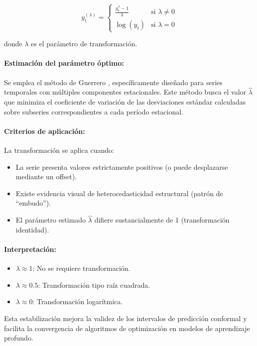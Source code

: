 \begin{equation}
y_t^{(\lambda)} = \begin{cases}
\frac{y_t^\lambda - 1}{\lambda} & \text{si } \lambda \neq 0 \\
\log(y_t) & \text{si } \lambda = 0
\end{cases}
\label{eq:boxcox}
\end{equation}

donde $\lambda$ es el parámetro de transformación.

\paragraph{Estimación del parámetro óptimo:} Se emplea el método de Guerrero \parencite{Guerrero1993}, específicamente diseñado para series temporales con múltiples componentes estacionales. Este método busca el valor $\hat{\lambda}$ que minimiza el coeficiente de variación de las desviaciones estándar calculadas sobre subseries correspondientes a cada período estacional.

\paragraph{Criterios de aplicación:} La transformación se aplica cuando:
\begin{itemize}
\item La serie presenta valores estrictamente positivos (o puede desplazarse mediante un offset).
\item Existe evidencia visual de heterocedasticidad estructural (patrón de ``embudo'').
\item El parámetro estimado $\hat{\lambda}$ difiere sustancialmente de 1 (transformación identidad).
\end{itemize}

\paragraph{Interpretación:}
\begin{itemize}
\item $\lambda \approx 1$: No se requiere transformación.
\item $\lambda \approx 0.5$: Transformación tipo raíz cuadrada.
\item $\lambda \approx 0$: Transformación logarítmica.
\end{itemize}

Esta estabilización mejora la validez de los intervalos de predicción conformal y facilita la convergencia de algoritmos de optimización en modelos de aprendizaje profundo.

